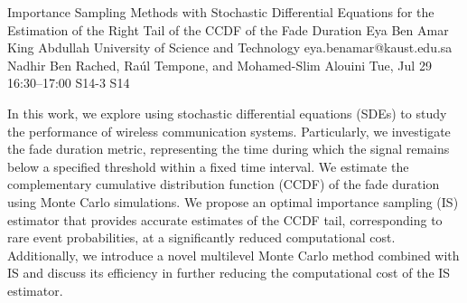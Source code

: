 \begin{talk}
  {Importance Sampling Methods with Stochastic Differential Equations for the Estimation of the Right Tail of the CCDF of the Fade Duration}%
  {Eya Ben Amar}%
  {King Abdullah University of Science and Technology}%
  {eya.benamar@kaust.edu.sa}%
  {Nadhir Ben Rached, Ra\'ul Tempone, and Mohamed-Slim Alouini}%
  {}%
  {Tue, Jul 29 16:30--17:00}%
  {S14-3}%
  {S14}%
  
    
In this work, we explore using stochastic differential equations (SDEs) to study the performance of wireless communication systems. Particularly, we investigate the fade duration metric, representing the time during which the signal remains below a specified threshold within a fixed time interval. We estimate the complementary cumulative distribution function (CCDF) of the fade duration using Monte Carlo simulations. We propose an optimal importance sampling (IS) estimator that provides accurate estimates of the CCDF tail, corresponding to rare event probabilities, at a significantly reduced computational cost. Additionally, we introduce a novel multilevel Monte Carlo method combined with IS and discuss its efficiency in further reducing the computational cost of the IS estimator.
\medskip

\end{talk}

